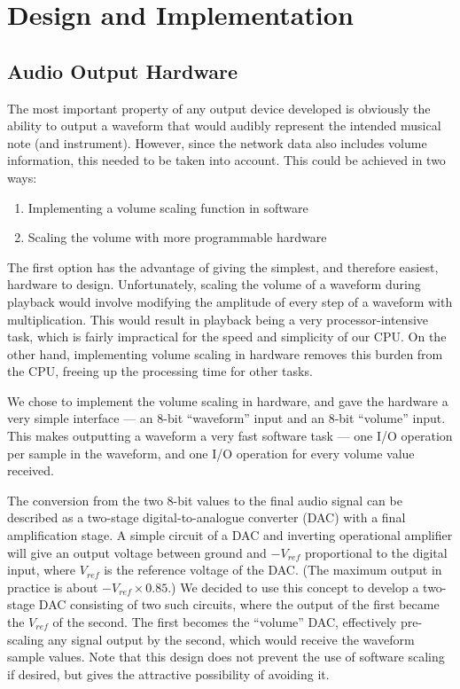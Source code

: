 \chapter{Design and Implementation}

\section{Audio Output Hardware}
\label{sec:design:hardware}

The most important property of any output device developed is obviously the ability to output a 
waveform that would audibly represent the intended musical note (and instrument).  However, since 
the network data also includes volume information, this needed to be taken into account.  This could 
be achieved in two ways:
\begin{enumerate}
\item Implementing a volume scaling function in software
\item Scaling the volume with more programmable hardware
\end{enumerate}
The first option has the advantage of giving the simplest, and therefore easiest, hardware to 
design.  Unfortunately, scaling the volume of a waveform during playback would involve modifying the 
amplitude of every step of a waveform with multiplication.  This would result in playback being a 
very processor-intensive task, which is fairly impractical for the speed and simplicity of our CPU.  
On the other hand, implementing volume scaling in hardware removes this burden from the CPU, freeing 
up the processing time for other tasks.

We chose to implement the volume scaling in hardware, and gave the hardware a very simple interface 
--- an 8-bit ``waveform'' input and an 8-bit ``volume'' input.  This makes outputting a waveform a 
very fast software task --- one I/O operation per sample in the waveform, and one I/O operation for 
every volume value received.

The conversion from the two 8-bit values to the final audio signal can be described as a two-stage 
digital-to-analogue converter (DAC) with a final amplification stage.  A simple circuit of a DAC and 
inverting operational amplifier will give an output voltage between ground and $-V_{ref}$ 
proportional to the digital input, where $V_{ref}$ is the reference voltage of the DAC.  (The 
maximum output in practice is about $-V_{ref}\times0.85$.)  We decided to use this concept to 
develop a two-stage DAC consisting of two such circuits, where the output of the first became the 
$V_{ref}$ of the second.  The first becomes the ``volume'' DAC, effectively pre-scaling any signal 
output by the second, which would receive the waveform sample values.  Note that this design does 
not prevent the use of software scaling if desired, but gives the attractive possibility of avoiding 
it.

